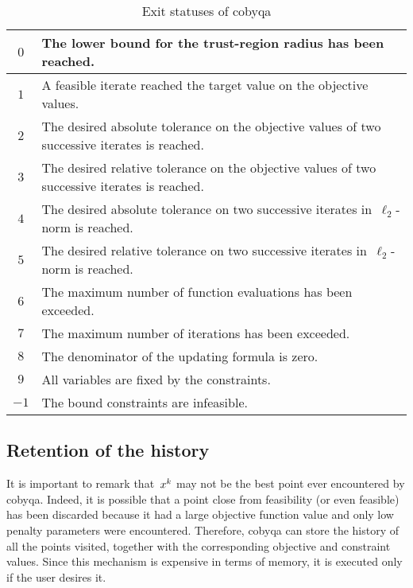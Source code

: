 \begin{table}[ht]
    \caption{Exit statuses of \gls{cobyqa}}
    \label{tab:exit-statuses}
    \centering
    \begin{tabularx}{\textwidth}{cX}
        \toprule
        $0$     & The lower bound for the trust-region radius has been reached.\\
        \midrule
        $1$     & A feasible iterate reached the target value on the objective values.\\
        \midrule
        $2$     & The desired absolute tolerance on the objective values of two successive iterates is reached.\\
        \midrule
        $3$     & The desired relative tolerance on the objective values of two successive iterates is reached.\\
        \midrule
        $4$     & The desired absolute tolerance on two successive iterates in~$\ell_2$-norm is reached.\\
        \midrule
        $5$     & The desired relative tolerance on two successive iterates in~$\ell_2$-norm is reached.\\
        \midrule
        $6$     & The maximum number of function evaluations has been exceeded.\\
        \midrule
        $7$     & The maximum number of iterations has been exceeded.\\
        \midrule
        $8$     & The denominator of the updating formula is zero.\\
        \midrule
        $9$     & All variables are fixed by the constraints.\\
        \midrule
        $-1$    & The bound constraints are infeasible.\\
        \bottomrule
    \end{tabularx}
\end{table}

\subsection{Retention of the history}

It is important to remark that~$\iter[k]$ may not be the best point ever encountered by \gls{cobyqa}.
Indeed, it is possible that a point close from feasibility (or even feasible) has been discarded because it had a large objective function value and only low penalty parameters were encountered.
Therefore, \gls{cobyqa} can store the history of all the points visited, together with the corresponding objective and constraint values.
Since this mechanism is expensive in terms of memory, it is executed only if the user desires it.

